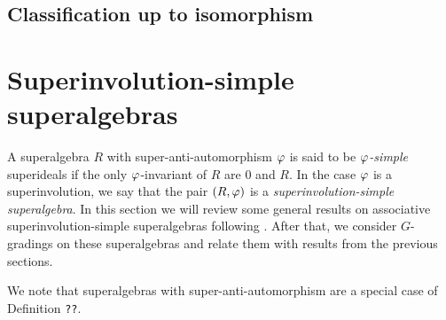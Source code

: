 \subsection{Classification up to isomorphism}


\section{Superinvolution-simple superalgebras}

A superalgebra $R$ with super-anti-automorphism $\varphi$ is said to be \emph{$\varphi$-simple} %
superideals if the only $\varphi$-invariant of $R$ are $0$ and $R$. 
In the case $\varphi$ is a superinvolution, we say that the pair $(R, \varphi)$ is a \emph{superinvolution-simple superalgebra}.
In this section we will review some general results on associative superinvolution-simple superalgebras following \cite{racine}. 
After that, we consider $G$-gradings on these superalgebras and relate them with results from the previous sections.

 
We note that superalgebras with super-anti-automorphism are a special case of Definition {\tt ??}. 

    
    
    
    

